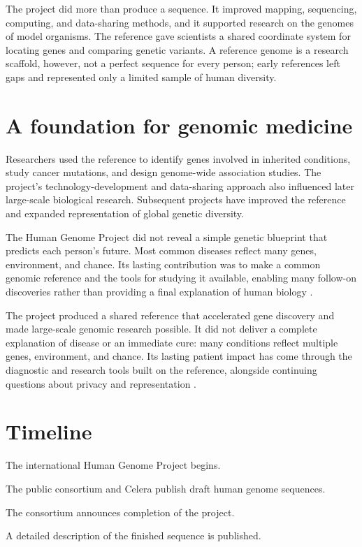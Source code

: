 \documentclass[12pt,oneside]{book}
\begin{document}
The project did more than produce a sequence. It improved mapping,
sequencing, computing, and data-sharing methods, and it supported research on
the genomes of model organisms. The reference gave scientists a shared
coordinate system for locating genes and comparing genetic variants. A
reference genome is a research scaffold, however, not a perfect sequence for
every person; early references left gaps and represented only a limited
sample of human diversity.

\section{A foundation for genomic medicine}
Researchers used the reference to identify genes involved in inherited
conditions, study cancer mutations, and design genome-wide association
studies. The project's technology-development and data-sharing approach also
influenced later large-scale biological research. Subsequent projects have
improved the reference and expanded representation of global genetic
diversity.

The Human Genome Project did not reveal a simple genetic blueprint that
predicts each person's future. Most common diseases reflect many genes,
environment, and chance. Its lasting contribution was to make a common
genomic reference and the tools for studying it available, enabling many
follow-on discoveries rather than providing a final explanation of human
biology \cite{nhgriHGPFactSheet}.

The project produced a shared reference that accelerated gene discovery and
made large-scale genomic research possible. It did not deliver a complete
explanation of disease or an immediate cure: many conditions reflect multiple
genes, environment, and chance. Its lasting patient impact has come through
the diagnostic and research tools built on the reference, alongside continuing
questions about privacy and representation
\cite{nhgriHGPCompletion,nhgriHGPFactSheet}.

\section*{Timeline}
\begin{description}[leftmargin=2.3cm,style=nextline]
  \item[1990] The international Human Genome Project begins.
  \item[2001] The public consortium and Celera publish draft human genome sequences.
  \item[2003] The consortium announces completion of the project.
  \item[2004] A detailed description of the finished sequence is published.
\end{description}
\end{document}

